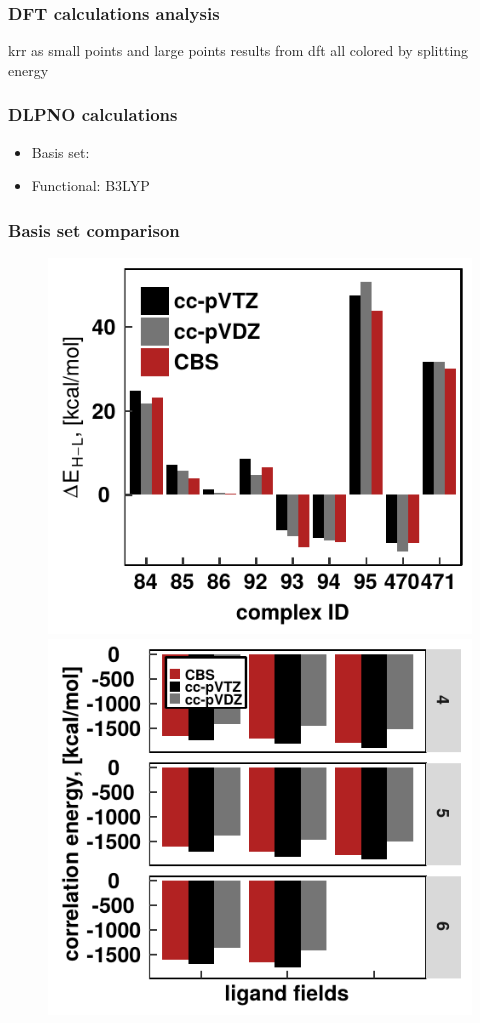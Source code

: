 \documentclass[xcolor=dvipsnames]{beamer}
\begin{document}
\begin{frame}
\frametitle{DFT calculations analysis}
krr as small points and large points results from dft all colored by splitting energy
\end{frame}

\begin{frame}
\frametitle{DLPNO calculations}
\begin{itemize}
	\item Basis set: 
	\item Functional: B3LYP
\end{itemize}
\end{frame}

\begin{frame}
\frametitle{Basis set comparison}
\begin{figure}[ht]  
	\begin{minipage}[b]{0.5\linewidth}
		\centering
		\includegraphics[width=.8\linewidth]{img/splitAllcomp.pdf} 
	\end{minipage}%
	\begin{minipage}[b]{0.5\linewidth}
		\centering
		\includegraphics[width=.8\linewidth]{img/corrVsBasis-CBS-high-spin.pdf} 
	\end{minipage} 
\end{figure}

\end{frame}
\end{document}
